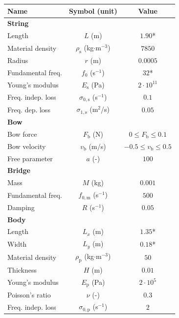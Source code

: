    \begin{table}[h!]
    \small
    \begin{center}
    \begin{tabular}{|l|c|c|}
        \hline
        Name & Symbol (unit) & Value\\ \hline
        \multicolumn{3}{|l|}{\bf String}\\ \hline
        Length & $L$ (m) & $1.90$*\\
        Material density & $\rho_\text{s}$ (kg$\cdot$m$^{-3}$) & $7850$\\ 
        Radius & $r$ (m) & $0.0005$\\
        Fundamental freq. & $f_0$ (s$^{-1}$)& $32$*\\ 
        Young's modulus & $E_\text{s}$ (Pa) & $2\cdot 10^{11}$\\
        Freq. indep. loss & $\sigma_{0,\text{s}}$ (s$^{-1}$) & $0.1$\\ 
        Freq. dep. loss & $\sigma_{1,\text{s}}$ (m$^2$/s) & $0.05$\\ \hline
        \multicolumn{3}{|l|}{\bf Bow}\\ \hline
        Bow force & $F_\text{b}$ (N) & $0 \leq F_\text{b} \leq 0.1 $\\
        Bow velocity & $v_\text{b}$ (m/s) & $-0.5 \leq v_\text{b} \leq 0.5 $\\
        Free parameter & $a$ (-) & $100$\\\hline
        \multicolumn{3}{|l|}{\bf Bridge}\\ \hline
        Mass & $M$ (kg) & $0.001$\\ 
        Fundamental freq. & $f_{0,\text{m}}$ (s$^{-1}$) & $500$\\ 
        Damping & $R$ (s$^{-1}$)& $0.05$\\
        \hline
        \multicolumn{3}{|l|}{\bf Body}\\ \hline
        Length & $L_x$ (m)& $1.35$*\\ 
        Width & $L_y$ (m)& $0.18$*\\ 
        Material density & $\rho_\text{p}$ (kg$\cdot$m$^{-3}$)& $50$\\ 
        Thickness& $H$ (m) & $0.01$\\ 
        Young's modulus & $E_\text{p}$ (Pa) & $2\cdot 10^{5}$\\ 
        Poisson's ratio & $\nu$ (-)& $0.3$\\
        Freq. indep. loss & $\sigma_{0,\text{p}}$ (s$^{-1}$)& $2$\\

\end{tabular}
\end{center}
\end{table}
